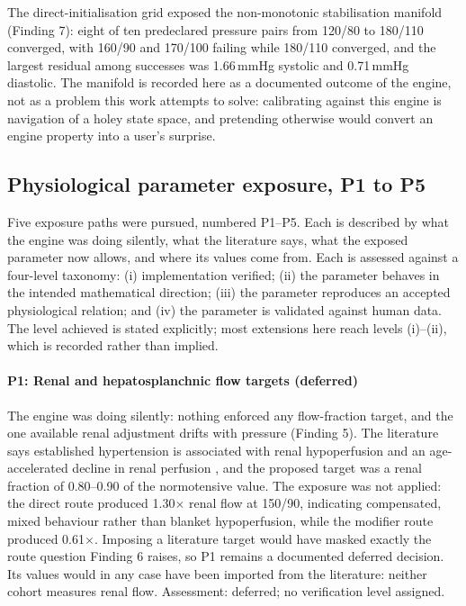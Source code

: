 \documentclass[preprint,12pt,nopreprintline]{elsarticle}
\begin{document}
The direct-initialisation grid exposed the non-monotonic stabilisation manifold (Finding 7): eight of ten predeclared pressure pairs from 120/80 to 180/110 converged, with 160/90 and 170/100 failing while 180/110 converged, and the largest residual among successes was 1.66\,mmHg systolic and 0.71\,mmHg diastolic. The manifold is recorded here as a documented outcome of the engine, not as a problem this work attempts to solve: calibrating against this engine is navigation of a holey state space, and pretending otherwise would convert an engine property into a user's surprise.

\subsection{Physiological parameter exposure, P1 to P5}

Five exposure paths were pursued, numbered P1--P5. Each is described by what the engine was doing silently, what the literature says, what the exposed parameter now allows, and where its values come from. Each is assessed against a four-level taxonomy: (i) implementation verified; (ii) the parameter behaves in the intended mathematical direction; (iii) the parameter reproduces an accepted physiological relation; and (iv) the parameter is validated against human data. The level achieved is stated explicitly; most extensions here reach levels (i)--(ii), which is recorded rather than implied.

\paragraph{P1: Renal and hepatosplanchnic flow targets (deferred)} The engine was doing silently: nothing enforced any flow-fraction target, and the one available renal adjustment drifts with pressure (Finding 5). The literature says established hypertension is associated with renal hypoperfusion and an age-accelerated decline in renal perfusion \cite{schmieder1994}, and the proposed target was a renal fraction of 0.80--0.90 of the normotensive value. The exposure was not applied: the direct route produced 1.30$\times$ renal flow at 150/90, indicating compensated, mixed behaviour rather than blanket hypoperfusion, while the modifier route produced 0.61$\times$. Imposing a literature target would have masked exactly the route question Finding 6 raises, so P1 remains a documented deferred decision. Its values would in any case have been imported from the literature: neither cohort measures renal flow. Assessment: deferred; no verification level assigned.
\end{document}
